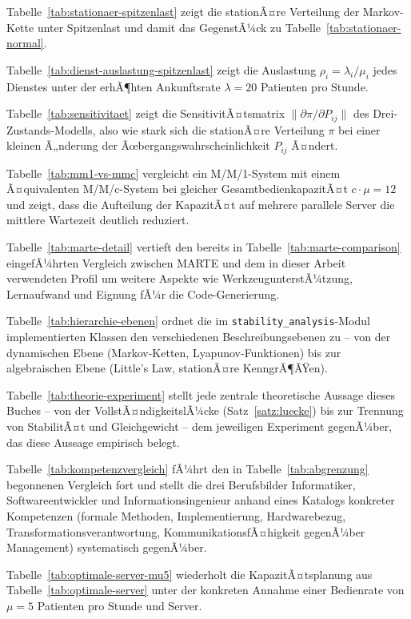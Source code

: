 ﻿\documentclass[a4paper,12pt]{report}
\theoremstyle{definition}
\begin{document}
Tabelle~\ref{tab:stationaer-spitzenlast} zeigt die stationÃ¤re Verteilung der Markov-Kette unter Spitzenlast und damit das GegenstÃ¼ck zu Tabelle~\ref{tab:stationaer-normal}.

Tabelle~\ref{tab:dienst-auslastung-spitzenlast} zeigt die Auslastung $\rho_i = \lambda_i / \mu_i$ jedes Dienstes unter der erhÃ¶hten Ankunftsrate $\lambda = 20$ Patienten pro Stunde.

Tabelle~\ref{tab:sensitivitaet} zeigt die SensitivitÃ¤tsmatrix $\|\partial \pi / \partial P_{ij}\|$ des Drei-Zustands-Modells, also wie stark sich die stationÃ¤re Verteilung $\pi$ bei einer kleinen Ã„nderung der Ãœbergangswahrscheinlichkeit $P_{ij}$ Ã¤ndert.

Tabelle~\ref{tab:mm1-vs-mmc} vergleicht ein M/M/1-System mit einem Ã¤quivalenten M/M/c-System bei gleicher GesamtbedienkapazitÃ¤t $c \cdot \mu = 12$ und zeigt, dass die Aufteilung der KapazitÃ¤t auf mehrere parallele Server die mittlere Wartezeit deutlich reduziert.

Tabelle~\ref{tab:marte-detail} vertieft den bereits in Tabelle~\ref{tab:marte-comparison} eingefÃ¼hrten Vergleich zwischen MARTE und dem in dieser Arbeit verwendeten Profil um weitere Aspekte wie WerkzeugunterstÃ¼tzung, Lernaufwand und Eignung fÃ¼r die Code-Generierung.

Tabelle~\ref{tab:hierarchie-ebenen} ordnet die im \texttt{stability\_analysis}-Modul implementierten Klassen den verschiedenen Beschreibungsebenen zu -- von der dynamischen Ebene (Markov-Ketten, Lyapunov-Funktionen) bis zur algebraischen Ebene (Little's Law, stationÃ¤re KenngrÃ¶ÃŸen).

Tabelle~\ref{tab:theorie-experiment} stellt jede zentrale theoretische Aussage dieses Buches -- von der VollstÃ¤ndigkeitslÃ¼cke (Satz~\ref{satz:luecke}) bis zur Trennung von StabilitÃ¤t und Gleichgewicht -- dem jeweiligen Experiment gegenÃ¼ber, das diese Aussage empirisch belegt.

Tabelle~\ref{tab:kompetenzvergleich} fÃ¼hrt den in Tabelle~\ref{tab:abgrenzung} begonnenen Vergleich fort und stellt die drei Berufsbilder Informatiker, Softwareentwickler und Informationsingenieur anhand eines Katalogs konkreter Kompetenzen (formale Methoden, Implementierung, Hardwarebezug, Transformationsverantwortung, KommunikationsfÃ¤higkeit gegenÃ¼ber Management) systematisch gegenÃ¼ber.

Tabelle~\ref{tab:optimale-server-mu5} wiederholt die KapazitÃ¤tsplanung aus Tabelle~\ref{tab:optimale-server} unter der konkreten Annahme einer Bedienrate von $\mu = 5$ Patienten pro Stunde und Server.
\end{document}
